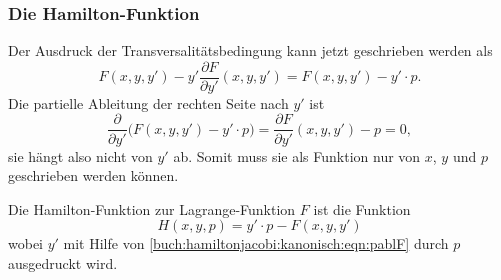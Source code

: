 %
%
\subsubsection{Die Hamilton-Funktion}
Der Ausdruck der Transversalitätsbedingung kann jetzt geschrieben werden
als 
\[
F(x,y,y') - y'\frac{\partial F}{\partial y'}(x,y,y')
=
F(x,y,y') - y'\cdot p.
\]
Die partielle Ableitung der rechten Seite nach $y'$ ist
\[
\frac{\partial}{\partial y'}
\biggl(
F(x,y,y') - y'\cdot p
\biggr)
=
\frac{\partial F}{\partial y'}(x,y,y') - p
=
0,
\]
sie hängt also nicht von $y'$ ab.
Somit muss sie als Funktion nur von $x$, $y$ und $p$ geschrieben werden
können.

\begin{definition}
\label{buch:hamiltonjacobi:kanonisch:def:hamilton-funktion}
Die Hamilton-Funktion zur Lagrange-Funktion $F$ ist die Funktion 
\[
H(x,y,p)
=
y'\cdot p - F(x,y,y')
\]
wobei $y'$ mit Hilfe von \eqref{buch:hamiltonjacobi:kanonisch:eqn:pablF}
durch $p$ ausgedruckt wird.
\end{definition}

